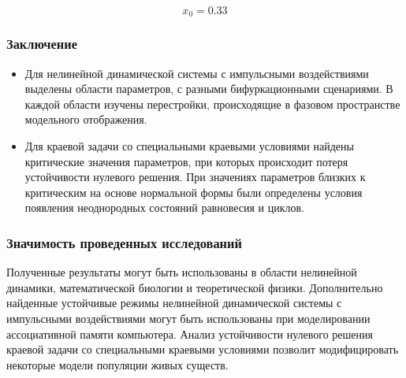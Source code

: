 \documentclass[fullscreen=true, unicode, bookmarks=false]{beamer}
\begin{document}
\begin{frame}
\begin{figure}[h]
\begin{minipage}[h]{0.2\linewidth}
\end{minipage}
\end{figure}

$$ x_0=0.33 $$

\end{frame}

\begin{frame}
\frametitle{ Заключение }

\begin{itemize}
\item Для нелинейной динамической системы с импульсными воздействиями выделены области параметров, с разными бифуркационными сценариями. В каждой области изучены перестройки, происходящие в фазовом пространстве модельного отображения.

\vfill

\item Для краевой задачи со специальными краевыми условиями найдены критические значения параметров, при которых происходит потеря устойчивости нулевого решения. При значениях параметров близких к критическим на основе нормальной формы были определены условия появления неоднородных состояний равновесия и циклов. 
\end{itemize}

\end{frame}

\begin{frame}
\frametitle{ Значимость проведенных исследований }

\begin{block}{}
Полученные результаты могут быть использованы в области нелинейной динамики, математической биологии и теоретической физики. Дополнительно найденные устойчивые режимы нелинейной динамической системы с импульсными воздействиями могут быть использованы при моделировании ассоциативной памяти компьютера. Анализ устойчивости нулевого решения краевой задачи со специальными краевыми условиями позволит модифицировать некоторые модели популяции живых существ.
\end{block}

\end{frame}
\end{document}
